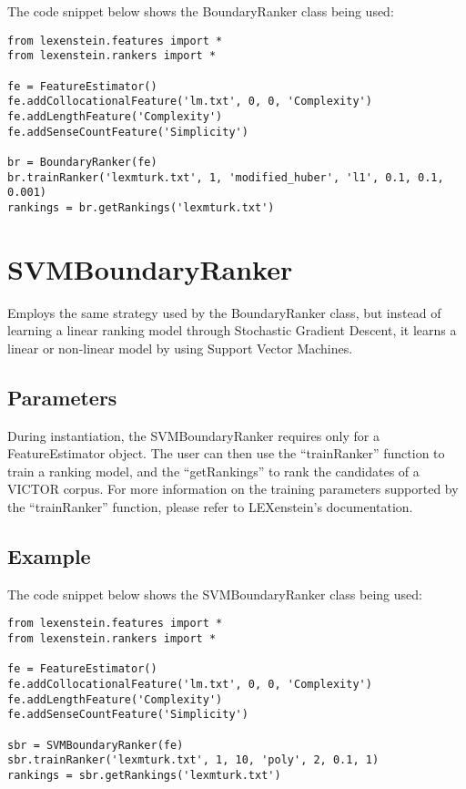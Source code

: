 The code snippet below shows the BoundaryRanker class being used:

\begin{lstlisting}
from lexenstein.features import *
from lexenstein.rankers import *

fe = FeatureEstimator()
fe.addCollocationalFeature('lm.txt', 0, 0, 'Complexity')
fe.addLengthFeature('Complexity')
fe.addSenseCountFeature('Simplicity')

br = BoundaryRanker(fe)
br.trainRanker('lexmturk.txt', 1, 'modified_huber', 'l1', 0.1, 0.1, 0.001)
rankings = br.getRankings('lexmturk.txt')
\end{lstlisting}















\section{SVMBoundaryRanker}

Employs the same strategy used by the BoundaryRanker class, but instead of learning a linear ranking model through Stochastic Gradient Descent, it learns a linear or non-linear model by using Support Vector Machines.

\subsection{Parameters}

During instantiation, the SVMBoundaryRanker requires only for a FeatureEstimator object. The user can then use the ``trainRanker'' function to train a ranking model, and the ``getRankings'' to rank the candidates of a VICTOR corpus. For more information on the training parameters supported by the ``trainRanker'' function, please refer to LEXenstein's documentation.

\subsection{Example}

The code snippet below shows the SVMBoundaryRanker class being used:

\begin{lstlisting}
from lexenstein.features import *
from lexenstein.rankers import *

fe = FeatureEstimator()
fe.addCollocationalFeature('lm.txt', 0, 0, 'Complexity')
fe.addLengthFeature('Complexity')
fe.addSenseCountFeature('Simplicity')

sbr = SVMBoundaryRanker(fe)
sbr.trainRanker('lexmturk.txt', 1, 10, 'poly', 2, 0.1, 1)
rankings = sbr.getRankings('lexmturk.txt')
\end{lstlisting}











